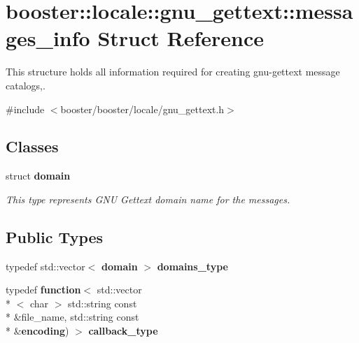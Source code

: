 \section{booster\-:\-:locale\-:\-:gnu\-\_\-gettext\-:\-:messages\-\_\-info Struct Reference}
\label{structbooster_1_1locale_1_1gnu__gettext_1_1messages__info}


This structure holds all information required for creating gnu-\/gettext message catalogs,.  




{\ttfamily \#include $<$booster/booster/locale/gnu\-\_\-gettext.\-h$>$}

\subsection*{Classes}
\begin{DoxyCompactItemize}
\item 
struct {\bf domain}
\begin{DoxyCompactList}\small\item\em This type represents G\-N\-U Gettext domain name for the messages. \end{DoxyCompactList}\end{DoxyCompactItemize}
\subsection*{Public Types}
\begin{DoxyCompactItemize}
\item 
typedef std\-::vector$<$ {\bf domain} $>$ {\bf domains\-\_\-type}
\item 
typedef {\bf function}$<$ std\-::vector\\*
$<$ char $>$ std\-::string const \\*
\&file\-\_\-name, std\-::string const \\*
\&{\bf encoding}) $>$ {\bf callback\-\_\-type}
\end{DoxyCompactItemize}
